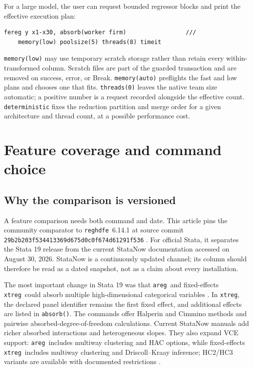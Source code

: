 \documentclass[11pt]{article}
\newcommand{\reghdfe}{\texttt{reghdfe}}
\newcommand{\areg}{\texttt{areg}}
\newcommand{\xtreg}{\texttt{xtreg}}
\begin{document}
For a large model, the user can request bounded regressor blocks and print the
effective execution plan:
\begin{lstlisting}
fereg y x1-x30, absorb(worker firm)                 ///
    memory(low) poolsize(5) threads(8) timeit
\end{lstlisting}
\texttt{memory(low)} may use temporary scratch storage rather than retain every
within-transformed column.  Scratch files are part of the guarded transaction
and are removed on success, error, or Break.  \texttt{memory(auto)} preflights
the fast and low plans and chooses one that fits.  \texttt{threads(0)} leaves
the native team size automatic; a positive number is a request recorded
alongside the effective count.  \texttt{deterministic} fixes the reduction
partition and merge order for a given architecture and thread count, at a
possible performance cost.

\section{Feature coverage and command choice}
\label{sec:coverage}

\subsection{Why the comparison is versioned}

A feature comparison needs both command and date.  This article pins the
community comparator to \reghdfe\ 6.14.1 at source commit
\texttt{29b2b203f534413369d675d0c0f674d61291f536}
\citep{correia2026reghdfe}.  For official Stata, it separates the Stata 19
release from the current StataNow documentation accessed on August 30, 2026.
StataNow is a continuously updated channel; its column should therefore be
read as a dated snapshot, not as a claim about every installation.

The most important change in Stata 19 was that \areg\ and fixed-effects
\xtreg\ could absorb multiple high-dimensional categorical variables
\citep{stata2025hdfe}.  In \xtreg, the declared panel identifier remains the
first fixed effect, and additional effects are listed in
\texttt{absorb()}.  The commands offer Halperin and Cimmino methods and
pairwise absorbed-degree-of-freedom calculations.  Current StataNow manuals
add richer absorbed interactions and heterogeneous slopes.  They also expand
VCE support: \areg\ includes multiway clustering and HAC options, while
fixed-effects \xtreg\ includes multiway clustering and Driscoll--Kraay
inference; HC2/HC3 variants are available with documented restrictions
\citep{stata2025areg,stata2025xtreg,statanow2026vce}.
\end{document}
